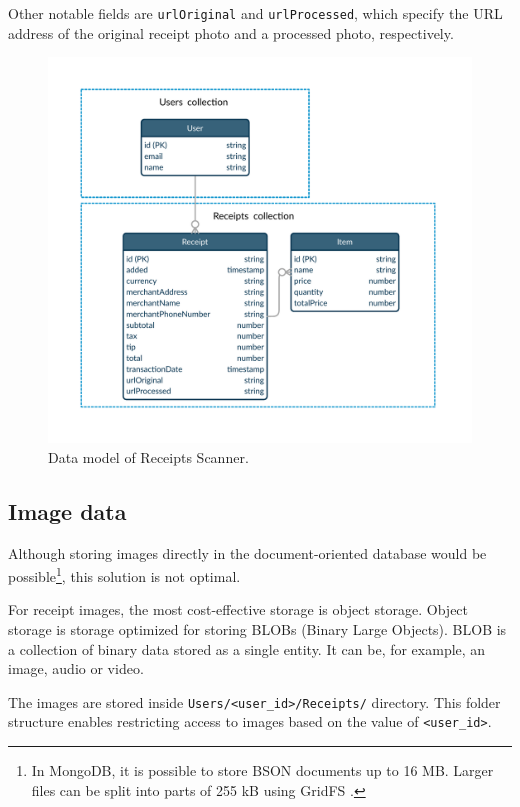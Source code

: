 \documentclass[
  digital, %
  table,   %
  oneside, %
  lof,     %
  lot,     %
]{fithesis3}
\newcommand{\definition}[1]{{#1}}
\begin{document}
Other notable fields are \texttt{urlOriginal} and \texttt{urlProcessed}, which specify the URL address of the original receipt photo and a processed photo, respectively. 

    \begin{figure}
        \begin{center}
            \includegraphics[width=\textwidth]{figures/other/data_model_firestore}
        \end{center}
        \caption{Data model of Receipts Scanner.}
        \label{fig:data_model_firestore}
    \end{figure}

\subsection{Image data}
Although storing images directly in the document-oriented database would be possible\footnote{In MongoDB, it is possible to store BSON documents up to 16 MB. Larger files can be split into parts of 255 kB using GridFS \cite{GridFS}.}, this solution is not optimal.

For receipt images, the most cost-effective storage is object storage. \definition{Object storage} is storage optimized for storing BLOBs (Binary Large Objects). BLOB is a collection of binary data stored as a single entity. It can be, for example, an image, audio or video. 

The images are stored inside \texttt{Users/<user\_id>/Receipts/} directory. This folder structure enables restricting access to images based on the value of \texttt{<user\_id>}.
\end{document}

